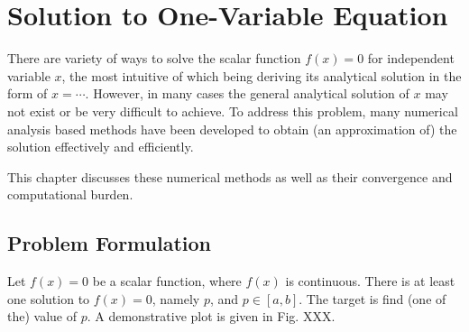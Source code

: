 \chapter{Solution to One-Variable Equation}

There are variety of ways to solve the scalar function $f(x)=0$ for independent variable $x$, the most intuitive of which being deriving its analytical solution in the form of $x=\cdots$. However, in many cases the general analytical solution of $x$ may not exist or be very difficult to achieve. To address this problem, many numerical analysis based methods have been developed to obtain (an approximation of) the solution effectively and efficiently.

This chapter discusses these numerical methods as well as their convergence and computational burden. 

\section{Problem Formulation}

Let $f(x)=0$ be a scalar function, where $f(x)$ is continuous. There is at least one solution to $f(x)=0$, namely $p$, and $p\in \left[a, b\right]$. The target is find (one of the) value of $p$. A demonstrative plot is given in Fig. XXX. 